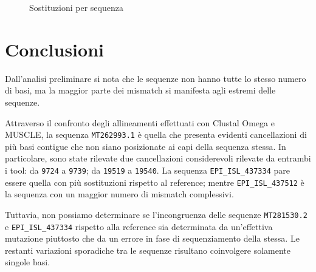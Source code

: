 \documentclass[11pt,italian]{article}
\begin{document}
\begin{figure}[H]
  \caption{Sostituzioni per sequenza}
  \label{fig:plot-replacements}
\end{figure}


\section{Conclusioni}
Dall'analisi preliminare si nota che le sequenze non hanno tutte lo stesso numero di basi, ma la maggior parte dei mismatch si manifesta agli estremi delle sequenze.

Attraverso il confronto degli allineamenti effettuati con Clustal Omega e MUSCLE, la sequenza \lstinline{MT262993.1} è quella che presenta evidenti cancellazioni di più basi contigue che non siano posizionate ai capi della sequenza stessa.
In particolare, sono state rilevate due cancellazioni considerevoli rilevate da entrambi i tool: da \lstinline{9724} a \lstinline{9739}; da \lstinline{19519} a \lstinline{19540}. La sequenza \lstinline{EPI_ISL_437334} pare essere quella con più sostituzioni rispetto al reference; mentre \lstinline{EPI_ISL_437512} è la sequenza con un maggior numero di mismatch complessivi.

Tuttavia, non possiamo determinare se l'incongruenza delle sequenze \lstinline{MT281530.2} e \lstinline{EPI_ISL_437334} rispetto alla reference sia determinata da un'effettiva mutazione piuttosto che da un errore in fase di sequenziamento della stessa.
Le restanti variazioni sporadiche tra le sequenze risultano coinvolgere solamente singole basi.
\end{document}
